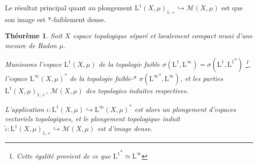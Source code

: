 \documentclass[a4paper,12pt]{article}
\newtheorem{theorem}{Théorème}[section]
\begin{document}
Le résultat principal quant au plongement $\mathrm{L}^1(X, \mu)_{1, +}\hookrightarrow \mathcal{M}(X, \mu)$ est que son image est $*$-faiblement dense.

\begin{theorem}\label{dense_in_means}
    Soit $X$ espace topologique séparé et localement compact muni d'une mesure de Radon $\mu$.

    Munissons l'espace $\mathrm{L}^1(X,\mu)$ de la topologie faible $\sigma(\mathrm{L}^1, \mathrm{L}^\infty) = \sigma\left(\mathrm{L}^1, {\mathrm{L}^1}^*\right)$
    \footnote{Cette égalité provient de ce que ${\mathrm{L}^1}^*\simeq\mathrm{L}^\infty$}, 
    l'espace $\mathrm{L}^\infty(X,\mu)^*$ de la topologie faible-$*$ $\sigma({\mathrm{L}^\infty}^*, \mathrm{L}^\infty)$,
    et les parties $\mathrm{L}^1(X, \mu)_{1, +}$, $\mathcal{M}(X, \mu)$ des topologies induites respectives.

    L'application $\iota:\mathrm{L}^1(X,\mu)\hookrightarrow\mathrm{L}^\infty(X,\mu)^*$ est alors un plongement d'espaces 
    vectoriels topologiques, et le plongement topologique induit $\widetilde{\iota}:\mathrm{L}^1(X, \mu)_{1, +}\hookrightarrow \mathcal{M}(X, \mu)$
    est d'image dense. 
\end{theorem}
\end{document}
